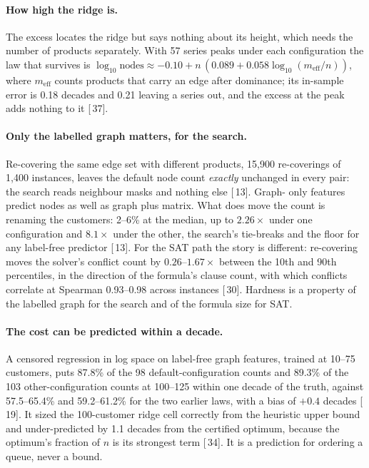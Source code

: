 \documentclass[11pt,a4paper]{article}
\renewcommand{\S}[1]{[\textsection\,#1]}
\begin{document}
\paragraph{How high the ridge is.}
The excess locates the ridge but says nothing about its height, which needs
the number of products separately. With 57 series peaks under each
configuration the law that survives is
$\log_{10}\text{nodes} \approx -0.10 + n\,(0.089 + 0.058 \log_{10}(m_{\mathrm{eff}}/n))$,
where $m_{\mathrm{eff}}$ counts products that carry an edge after dominance;
its in-sample error is 0.18 decades and 0.21 leaving a series out, and the
excess at the peak adds nothing to it \S{37}.

\paragraph{Only the labelled graph matters, for the search.}
Re-covering the same edge set with different products, 15,900 re-coverings of
1,400 instances, leaves the default node count \emph{exactly} unchanged in
every pair: the search reads neighbour masks and nothing else \S{13}. Graph-
only features predict nodes as well as graph plus matrix. What does move the
count is renaming the customers: 2--6\% at the median, up to $2.26\times$
under one configuration and $8.1\times$ under the other, the search's
tie-breaks and the floor for any label-free predictor \S{13}. For the SAT
path the story is different: re-covering moves the solver's conflict count by
$0.26$--$1.67\times$ between the 10th and 90th percentiles, in the direction
of the formula's clause count, with which conflicts correlate at Spearman
0.93--0.98 across instances \S{30}. Hardness is a property of the labelled
graph for the search and of the formula size for SAT.

\paragraph{The cost can be predicted within a decade.}
A censored regression in log space on label-free graph features, trained at
10--75 customers, puts 87.8\% of the 98 default-configuration counts and
89.3\% of the 103 other-configuration counts at 100--125 within one decade of
the truth, against 57.5--65.4\% and 59.2--61.2\% for the two earlier laws,
with a bias of $+0.4$ decades \S{19}. It sized the 100-customer ridge cell
correctly from the heuristic upper bound and under-predicted by 1.1 decades
from the certified optimum, because the optimum's fraction of $n$ is its
strongest term \S{34}. It is a prediction for ordering a queue, never a bound.
\end{document}
